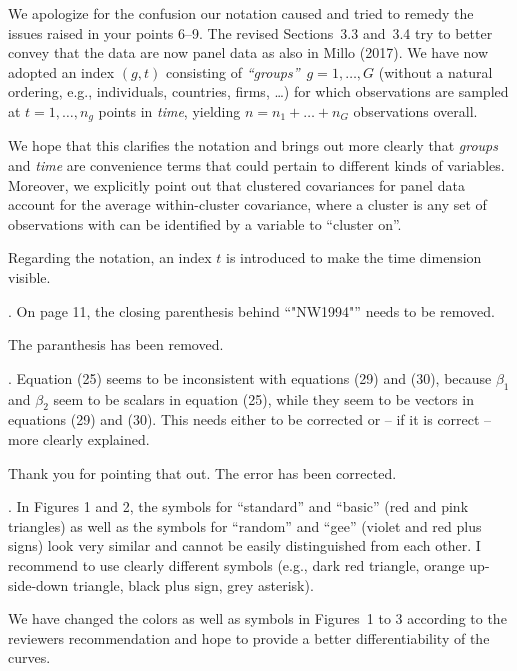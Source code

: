 \documentclass[american,foldmarks=false]{uibklttr}
\newenvironment{review}{\fontshape{\itdefault}\fontseries{\bfdefault} \selectfont \smallskip}{\par}
\begin{document}
We apologize for the confusion our notation caused and tried to remedy the
issues raised in your points 6--9. The revised Sections~3.3 and~3.4 try to
better convey that the data are now panel data as also in Millo (2017).
We have now adopted an index $(g, t)$ consisting of
\emph{``groups''}~$g = 1, \dots, G$ (without a natural ordering, e.g.,
individuals, countries, firms, \ldots) for which observations are sampled
at $t = 1, \ldots, n_g$ points in \emph{time}, yielding $n = n_1 + \dots + n_G$
observations overall.

We hope that this clarifies the notation and brings out more clearly that
\emph{groups} and \emph{time} are convenience terms that could pertain to
different kinds of variables. Moreover, we explicitly point out that
clustered covariances for panel data account for the average within-cluster
covariance, where a cluster is any set of observations with can be identified by
a variable to ``cluster on''. 

Regarding the notation, an index $t$ is introduced to make the time dimension
visible.


\begin{review}
10. On page 11, the closing parenthesis behind ``"NW1994"''
needs to be removed.
\end{review}

The paranthesis has been removed.


\begin{review}
11. Equation (25) seems to be inconsistent with equations (29)
and (30), because $\beta_1$ and $\beta_2$ seem to be scalars in equation (25),
while they seem to be vectors in equations (29) and (30). This needs either to
be corrected or -- if it is correct -- more clearly explained.
\end{review}

Thank you for pointing that out. The error has been corrected.


\begin{review}
12. In Figures 1 and 2, the symbols for ``standard'' and
``basic'' (red and pink triangles) as well as the symbols for ``random'' and
``gee'' (violet and red plus signs) look very similar and cannot be easily
distinguished from each other. I recommend to use clearly different symbols
(e.g., dark red triangle, orange up-side-down triangle, black plus sign, grey
asterisk).
\end{review}

We have changed the colors as well as symbols in Figures~1 to 3 according to the
reviewers recommendation and hope to provide a better differentiability of the
curves.
\end{document}
